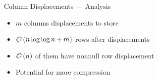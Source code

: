 \begin{frame}{Column Displacements --- Analysis}
	\begin{itemize}[<+->]
		\itemspacing{20pt}
		\item $m$ columns displacements to store
		\item $\mathcal{O}\left(n \log \log n + m\right)$ rows after displacements
		\item $\mathcal{O}\left(n\right)$ of them have nonnull row displacement
		\item Potential for more compression
	\end{itemize}
\end{frame}